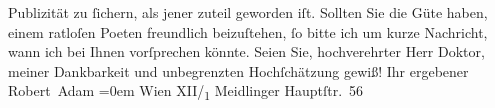 \begin{ledgroupsized}[t]{13cm}
               Publizität zu ſichern, als jener zuteil geworden iſt.\pend
           \pstart
           Sollten Sie die Güte haben, einem ratloſen Poeten freundlich beizuſtehen, ſo bitte
               ich um kurze Nachricht, wann ich bei Ihnen vorſprechen könnte.\pend
           \pstart
           Seien Sie, hochverehrter Herr Doktor, meiner Dankbarkeit und unbegrenzten
               Hochſchätzung gewiß!\pend
           \pstart
           Ihr ergebener{\\[\baselineskip]}\spacefill\mbox{Robert Adam}\pend
           \leftskip=0em{}\pstart
           \noindent{}Wien XII/\textsubscript{1} Meidlinger
                     Hauptſtr. 56\pend
           
         
         \endnumbering{}\end{ledgroupsized}  \newcommand{\dateiname}{L01972}\newcommand{\titel}{Robert Adam an Arthur Schnitzler, 29. 10. 1910}\newcommand{\editorInnen}{Martin Anton Müller und Gerd-Hermann Susen}
      